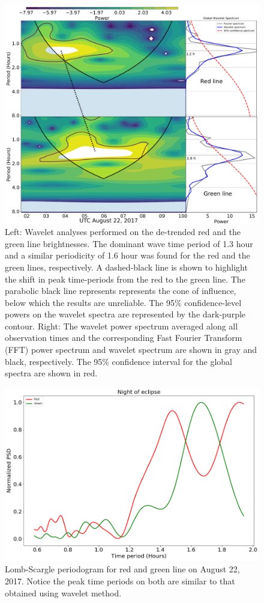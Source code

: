 \documentclass[crop=false,class=mitthesis,oneside,font=12pt]{standalone}
\begin{document}
\begin{figure}[H]
\centering\includegraphics[width=35pc]{wavelet_red_green.pdf}
\caption{Left: Wavelet analyses performed on the de-trended red and the green line brightnesses. The dominant wave time period of 1.3 hour and a similar periodicity of 1.6 hour was found for the red and the green lines, respectively. A dashed-black line is shown to highlight the shift in peak time-periods from the red to the green line. The parabolic black line represents represents the cone of influence, below which the results are unreliable. The 95\% confidence-level powers on the wavelet spectra are represented by the dark-purple contour.  Right: The wavelet power spectrum averaged along all observation times and the corresponding Fast Fourier Transform (FFT) power spectrum and wavelet spectrum are shown in gray and black, respectively. The 95$\%$ confidence interval for the global spectra are shown in red. }
\label{fig:red_green_wv}
\end{figure}
\begin{figure}[H]
	\centering\includegraphics[width=30pc]{lomb.png}
	\caption{Lomb-Scargle periodogram for red and green line on August 22, 2017. Notice the peak time periods on both are similar to that obtained using wavelet method.}
	\label{fig:lomg}
\end{figure}
 
\end{document}
